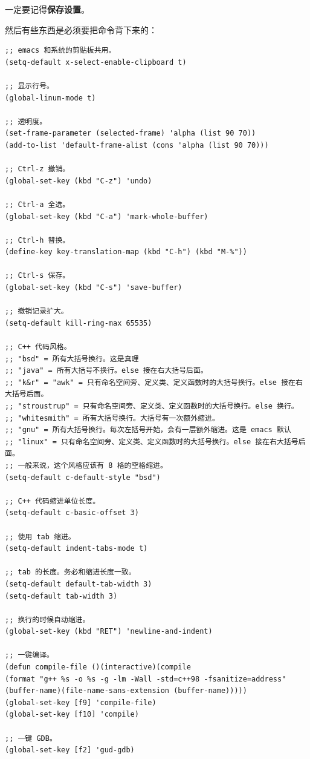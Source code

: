 \documentclass[UTF-8]{ctexart}
\begin{document}
				一定要记得\textbf{\large 保存设置}。
				
				然后有些东西是必须要把命令背下来的：
				
				\begin{verbatim}
;; emacs 和系统的剪贴板共用。
(setq-default x-select-enable-clipboard t)

;; 显示行号。
(global-linum-mode t)

;; 透明度。
(set-frame-parameter (selected-frame) 'alpha (list 90 70))
(add-to-list 'default-frame-alist (cons 'alpha (list 90 70)))

;; Ctrl-z 撤销。
(global-set-key (kbd "C-z") 'undo)

;; Ctrl-a 全选。
(global-set-key (kbd "C-a") 'mark-whole-buffer)

;; Ctrl-h 替换。
(define-key key-translation-map (kbd "C-h") (kbd "M-%"))

;; Ctrl-s 保存。
(global-set-key (kbd "C-s") 'save-buffer)

;; 撤销记录扩大。
(setq-default kill-ring-max 65535)

;; C++ 代码风格。
;; "bsd" = 所有大括号换行。这是真理
;; "java" = 所有大括号不换行。else 接在右大括号后面。
;; "k&r" = "awk" = 只有命名空间旁、定义类、定义函数时的大括号换行。else 接在右大括号后面。
;; "stroustrup" = 只有命名空间旁、定义类、定义函数时的大括号换行。else 换行。
;; "whitesmith" = 所有大括号换行。大括号有一次额外缩进。
;; "gnu" = 所有大括号换行。每次左括号开始，会有一层额外缩进。这是 emacs 默认
;; "linux" = 只有命名空间旁、定义类、定义函数时的大括号换行。else 接在右大括号后面。
;; 一般来说，这个风格应该有 8 格的空格缩进。
(setq-default c-default-style "bsd")

;; C++ 代码缩进单位长度。
(setq-default c-basic-offset 3)

;; 使用 tab 缩进。
(setq-default indent-tabs-mode t)

;; tab 的长度。务必和缩进长度一致。
(setq-default default-tab-width 3)
(setq-default tab-width 3)

;; 换行的时候自动缩进。
(global-set-key (kbd "RET") 'newline-and-indent)

;; 一键编译。
(defun compile-file ()(interactive)(compile 
(format "g++ %s -o %s -g -lm -Wall -std=c++98 -fsanitize=address" 
(buffer-name)(file-name-sans-extension (buffer-name)))))
(global-set-key [f9] 'compile-file)
(global-set-key [f10] 'compile)

;; 一键 GDB。
(global-set-key [f2] 'gud-gdb)
				\end{verbatim}
				
\end{document}
